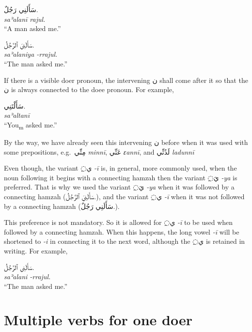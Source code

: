 \documentclass[
  10pt,
]{book}
\begin{document}
\begin{itemize}
  \foreignlanguage{arabic}{سَأَلَنِي رَجُلٌ.}\\
  \emph{saʾalanī rajul.}\\
  \enquote{A man asked me.}

  \foreignlanguage{arabic}{سَأَلَنِيَ ٱلرَّجُلُ.}\\
  \emph{saʾalaniya -rrajul.}\\
  \enquote{The man asked me.}

  If there is a visible doer pronoun, the intervening \foreignlanguage{arabic}{ن} shall come after it so that the \foreignlanguage{arabic}{ن} is always connected to the doee pronoun. For example,

  \foreignlanguage{arabic}{سَأَلْتَنِي.}\\
  \emph{saʾaltanī}\\
  \enquote{You\textsubscript{m} asked me.}

  By the way, we have already seen this intervening \foreignlanguage{arabic}{ن} before when it was used with some prepositions, e.g.~\foreignlanguage{arabic}{مِنِّي} \emph{minnī}, \foreignlanguage{arabic}{عَنِّي} \emph{ɛannī}, and \foreignlanguage{arabic}{لَدُنِّي} \emph{ladunnī}

  Even though, the variant \foreignlanguage{arabic}{◌ِي} \emph{-ī} is, in general, more commonly used, when the noun following it begins with a connecting hamzah then the variant \foreignlanguage{arabic}{◌ِيَ} \emph{-ya} is preferred. That is why we used the variant \foreignlanguage{arabic}{◌ِيَ} \emph{-ya} when it was followed by a connecting hamzah (\foreignlanguage{arabic}{سَأَلَنِيَ ٱلرَّجُلُ.}), and the variant \foreignlanguage{arabic}{◌ِي} \emph{-ī} when it was not followed by a connecting hamzah (\foreignlanguage{arabic}{سَأَلَنِي رَجُلٌ.}).

  This preference is not mandatory. So it is allowed for \foreignlanguage{arabic}{◌ِي} \emph{-ī} to be used when followed by a connecting hamzah. When this happens, the long vowel \emph{-ī} will be shortened to \emph{-i} in connecting it to the next word, although the \foreignlanguage{arabic}{◌ِي} is retained in writing. For example,

  \foreignlanguage{arabic}{سَأَلَنِي ٱلرَّجُلُ.}\\
  \emph{saʾalani -rrajul.}\\
  \enquote{The man asked me.}
\end{itemize}

\section{Multiple verbs for one doer}\label{multiple-verbs-for-one-doer}
\end{document}
